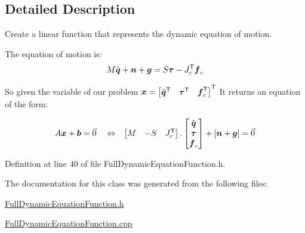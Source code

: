 \subsection{Detailed Description}
Create a linear function that represents the dynamic equation of motion. 

The equation of motion is\+: \[ M \ddot{\mbox{\boldmath${q}$}} + \mbox{\boldmath${n}$} + \mbox{\boldmath${g}$} = S \mbox{\boldmath${\tau}$} - J_c^{\mathsf{T}} \mbox{\boldmath${f}$}_c \]

So given the variable of our problem $ \mbox{\boldmath${x}$} = \begin{bmatrix} \ddot{\mbox{\boldmath${q}$}}^{\mathsf{T}} & \mbox{\boldmath${\tau}$}^{\mathsf{T}} & \mbox{\boldmath${f}$}_c^{\mathsf{T}}\end{bmatrix}^{\mathsf{T}} $ It returns an equation of the form\+:

\begin{align*} A \mbox{\boldmath${x}$} + \mbox{\boldmath${b}$} &= \vec{0} & &\Leftrightarrow & \begin{bmatrix} M & -S & J_c^{\mathsf{T}} \end{bmatrix} . \begin{bmatrix} \ddot{\mbox{\boldmath${q}$}} \\ \mbox{\boldmath${\tau}$} \\ \mbox{\boldmath${f}$}_c\end{bmatrix} + [ \mbox{\boldmath${n}$} + \mbox{\boldmath${g}$} ] = \vec{0} \end{align*} 

Definition at line 40 of file Full\+Dynamic\+Equation\+Function.\+h.



The documentation for this class was generated from the following files\+:\begin{DoxyCompactItemize}
\item 
\hyperlink{FullDynamicEquationFunction_8h}{Full\+Dynamic\+Equation\+Function.\+h}\item 
\hyperlink{FullDynamicEquationFunction_8cpp}{Full\+Dynamic\+Equation\+Function.\+cpp}\end{DoxyCompactItemize}
